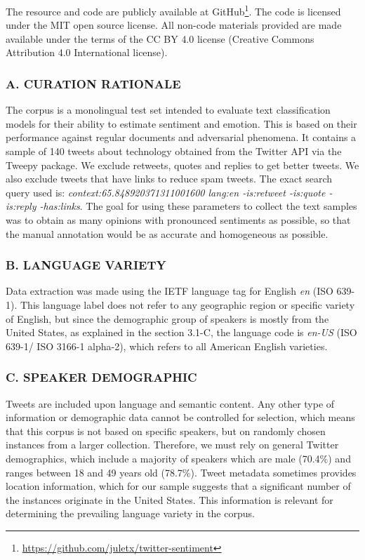\documentclass[11pt,a4paper]{article}
\begin{document}
\cite{bender-friedman-2018-data}

The resource and code are publicly available at GitHub\footnote{\url{https://github.com/juletx/twitter-sentiment}}. The code is licensed under the MIT open source license. All non-code materials provided are made available under the terms of the CC BY 4.0 license
(Creative Commons Attribution 4.0 International license).

\subsubsection*{A. CURATION RATIONALE}
The corpus is a monolingual test set intended to evaluate text classification models for their ability to estimate sentiment and emotion. This is based on their performance against regular documents and adversarial phenomena. It contains a sample of 140 tweets about technology obtained from the Twitter API via the Tweepy package. We exclude retweets, quotes and replies to get better tweets. We also exclude tweets that have links to reduce spam tweets. The exact search query used is:  \textit{context:65.848920371311001600 lang:en -is:retweet -is:quote -is:reply -has:links}. The goal for using these parameters to collect the text samples was to obtain as many opinions with pronounced sentiments as possible, so that the manual annotation would be as accurate and homogeneous as possible.

\subsubsection*{B. LANGUAGE VARIETY}
Data extraction was made using the IETF language tag for English \textit{en} (ISO 639-1). This language label does not refer to any geographic region or specific variety of English, but since the demographic group of speakers is mostly from the United States, as explained in the section 3.1-C, the language code is \textit{en-US} (ISO 639-1/ ISO 3166-1 alpha-2), which refers to all American English varieties.

\subsubsection*{C. SPEAKER DEMOGRAPHIC}
Tweets are included upon language and semantic content. Any other type of information or demographic data cannot be controlled for selection, which means that this corpus is not based on specific speakers, but on randomly chosen instances from a larger collection.
Therefore, we must rely on general Twitter demographics, which include a majority of speakers which are male (70.4\%) and ranges between 18 and 49 years old (78.7\%). Tweet metadata sometimes provides location information, which for our sample suggests that a significant number of the instances originate in the United States. This information is relevant for determining the prevailing language variety in the corpus.
\end{document}

